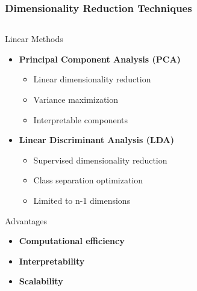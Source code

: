 \documentclass[aspectratio=43]{beamer}
\begin{document}
\begin{frame}
    \frametitle{Dimensionality Reduction Techniques}
    
    \begin{columns}
        \begin{column}{0.5\textwidth}
            \begin{block}{Linear Methods}
                \begin{itemize}
                    \item \textbf{Principal Component Analysis (PCA)}
                        \begin{itemize}
                            \item Linear dimensionality reduction
                            \item Variance maximization
                            \item Interpretable components
                        \end{itemize}
                    \item \textbf{Linear Discriminant Analysis (LDA)}
                        \begin{itemize}
                            \item Supervised dimensionality reduction
                            \item Class separation optimization
                            \item Limited to n-1 dimensions
                        \end{itemize}
                \end{itemize}
            \end{block}
            
            \begin{exampleblock}{Advantages}
                \begin{itemize}
                    \item \textbf{Computational efficiency}
                    \item \textbf{Interpretability}
                    \item \textbf{Scalability}
                \end{itemize}
            \end{exampleblock}
        \end{column}
        

\end{columns}
\end{frame}
\end{document}
